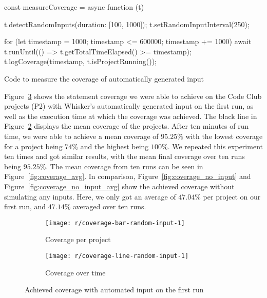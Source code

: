 \begin{listing}[ht]
    \centering

    \begin{minipage}{.9\textwidth}
        \begin{javascriptcode}
            const measureCoverage = async function (t) {
                t.detectRandomInputs({duration: [100, 1000]});
                t.setRandomInputInterval(250);

                for (let timestamp = 1000; timestamp <= 600000; timestamp += 1000) {
                    await t.runUntil(() => t.getTotalTimeElapsed() >= timestamp);
                    t.logCoverage(timestamp, t.isProjectRunning());
                }
            }
        \end{javascriptcode}
    \end{minipage}

    \caption{Code to measure the coverage of automatically generated input}
    \label{lst:coverage_test}
\end{listing}

\noindent Figure~\ref{fig:coverage} shows the statement coverage we were able to achieve on the Code Club projects (P2)
with Whisker's automatically generated input on the first run,
as well as the execution time at which the coverage was achieved.
The black line in Figure~\ref{fig:coverage_line} displays the mean coverage of the projects.
After ten minutes of run time, we were able to achieve a mean coverage of $95.25\%$ with the lowest coverage for a project being $74\%$ and the highest being $100\%$.
We repeated this experiment ten times and got similar results, with the mean final coverage over ten runs being $95.25\%$.
The mean coverage from ten runs can be seen in Figure~\ref{fig:coverage_avg}.
In comparison, Figure~\ref{fig:coverage_no_input} and Figure~\ref{fig:coverage_no_input_avg} show the achieved coverage without simulating any inputs.
Here, we only got an average of $47.04\%$ per project on our first run, and $47.14\%$ averaged over ten runs.
\parspace

\begin{figure}[htpb]
    \centering
    \begin{subfigure}{.95\textwidth}
        \texttt{[image: r/coverage-bar-random-input-1]}
        \caption{Coverage per project}
        \label{fig:coverage_bar}
    \end{subfigure}

    \bigskip

    \begin{subfigure}{.95\textwidth}
        \texttt{[image: r/coverage-line-random-input-1]}
        \caption{Coverage over time}
        \label{fig:coverage_line}
    \end{subfigure}

    \caption{Achieved coverage with automated input on the first run}
    \label{fig:coverage}
\end{figure}

